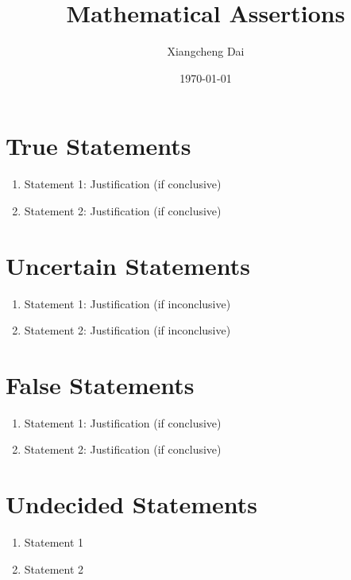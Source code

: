 \documentclass{article}
\begin{document}
\title{Mathematical Assertions}
\author{Xiangcheng Dai}
\date{\today}

\maketitle

\section{True Statements}

\begin{enumerate}
    \item Statement 1: Justification (if conclusive)
    \item Statement 2: Justification (if conclusive)
\end{enumerate}

\section{Uncertain Statements}

\begin{enumerate}
    \item Statement 1: Justification (if inconclusive)
    \item Statement 2: Justification (if inconclusive)
\end{enumerate}

\section{False Statements}

\begin{enumerate}
    \item Statement 1: Justification (if conclusive)
    \item Statement 2: Justification (if conclusive)
\end{enumerate}

\section{Undecided Statements}

\begin{enumerate}
    \item Statement 1
    \item Statement 2
\end{enumerate}
\end{document}

